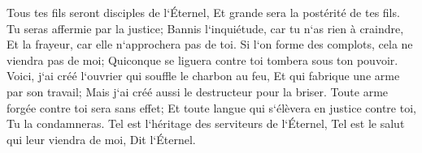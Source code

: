 \verse Tous tes fils seront disciples de l`Éternel, Et grande sera la postérité de tes fils. 
\verse Tu seras affermie par la justice; Bannis l`inquiétude, car tu n`as rien à craindre, Et la frayeur, car elle n`approchera pas de toi. 
\verse Si l`on forme des complots, cela ne viendra pas de moi; Quiconque se liguera contre toi tombera sous ton pouvoir. 
\verse Voici, j`ai créé l`ouvrier qui souffle le charbon au feu, Et qui fabrique une arme par son travail; Mais j`ai créé aussi le destructeur pour la briser. 
\verse Toute arme forgée contre toi sera sans effet; Et toute langue qui s`élèvera en justice contre toi, Tu la condamneras. Tel est l`héritage des serviteurs de l`Éternel, Tel est le salut qui leur viendra de moi, Dit l`Éternel. 

